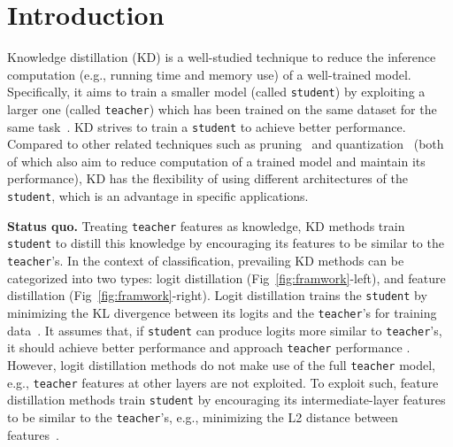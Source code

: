 \documentclass{article}
\begin{document}
\section{Introduction}

Knowledge distillation (KD) is a well-studied technique to reduce the inference computation (e.g., running time and memory use) of a well-trained model.
Specifically, it aims to train a smaller model (called {\tt student}) by exploiting a larger one (called {\tt teacher}) which has been trained on the same dataset for the same task~\cite{hinton2015distilling}.
KD strives to train a {\tt student} to achieve better performance.
Compared to other related techniques such as pruning~\cite{ye2018rethinking} and quantization~\cite{han2015deep} (both of which also aim to reduce computation of a trained model and maintain its performance),
KD has the flexibility of using different architectures of the {\tt student}, which is an advantage in specific applications.


{\bf Status quo.}
Treating {\tt teacher} features as knowledge, KD methods train {\tt student} to distill this knowledge by encouraging its features to be similar to the {\tt teacher}'s.
In the context of classification, prevailing KD methods can be categorized into two types: logit distillation (Fig~\ref{fig:framwork}-left), and feature distillation (Fig~\ref{fig:framwork}-right).
Logit distillation trains the {\tt student} by minimizing the KL divergence between its logits and the {\tt teacher}’s for training data~\cite{hinton2015distilling, zhao2022decoupled}. It assumes that, if {\tt student} can produce logits more similar to {\tt teacher}’s, it should achieve better performance and approach {\tt teacher} performance . 
However, logit distillation methods do not make use of the full {\tt teacher} model, e.g., {\tt teacher} features at other layers are not exploited.
To exploit such, feature distillation methods train {\tt student} by encouraging its intermediate-layer features to be similar to the {\tt teacher}'s, e.g., minimizing the L2 distance between features~\cite{chen2021distilling, zagoruyko2016paying}. 
\end{document}
